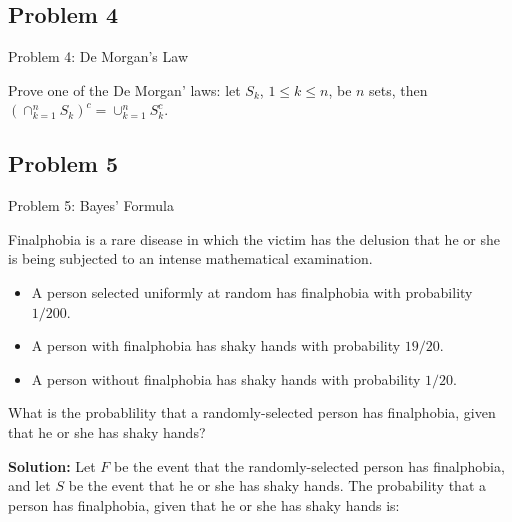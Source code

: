 \documentclass{beamer}
\begin{document}
\subsection{Problem 4}
\begin{frame}{Problem 4: De Morgan's Law}
\begin{block}{}
Prove one of the De Morgan' laws: let $S_k$, $1\leq k\leq n$, be $n$ sets, then $\left(\cap_{k=1}^n S_k\right)^c = \cup_{k=1}^n S^c_k$.\\
\end{block}
\vspace{0.3cm}
\end{frame}

\subsection{Problem 5}
\begin{frame}{Problem 5: Bayes' Formula}
    \begin{block}{}
    Finalphobia is a rare disease in which the victim has the delusion that he or she is being subjected to an intense mathematical examination. 
    \begin{itemize}
        \item A person selected uniformly at random has finalphobia with probability $1/200$.
        \item A person with finalphobia has shaky hands with probability $19/20$. 
        \item A person without finalphobia has shaky hands with probability $1/20$. 
    \end{itemize}
    What is the probablility that a randomly-selected person has finalphobia, given that he or she has shaky hands? \\
    \end{block}
    \vspace{0.3cm}
    \textbf{Solution:} Let $F$ be the event that the randomly-selected person has finalphobia, and let $S$ be the event that he or she has shaky hands. The probability that a person has finalphobia, given that he or she has shaky hands is: 
\end{frame}
\end{document}
